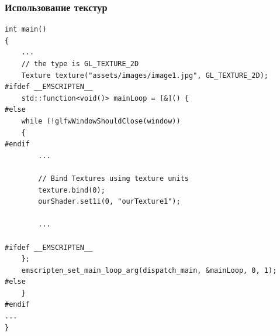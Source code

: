 \documentclass[12pt]{article}
\begin{document}
    \subsubsection{Использование текстур}
    \begin{verbatim}
int main()
{
    ...
    // the type is GL_TEXTURE_2D
    Texture texture("assets/images/image1.jpg", GL_TEXTURE_2D);
#ifdef __EMSCRIPTEN__
    std::function<void()> mainLoop = [&]() {
#else
    while (!glfwWindowShouldClose(window))
    {
#endif
        ...

        // Bind Textures using texture units
        texture.bind(0);
        ourShader.set1i(0, "ourTexture1");
        
        ...

#ifdef __EMSCRIPTEN__
    };
    emscripten_set_main_loop_arg(dispatch_main, &mainLoop, 0, 1);
#else
    }
#endif
...
}
    \end{verbatim}
\end{document}
